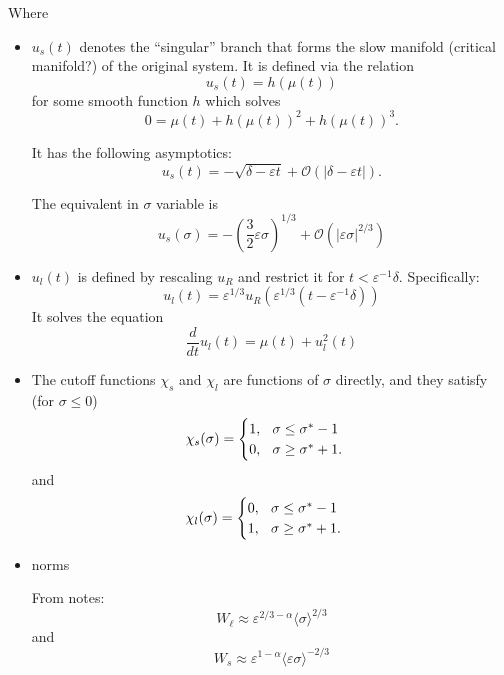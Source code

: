 \documentclass[letterpaper,11pt]{article}
\newcommand{\rmO}{\mathcal{O}}
\newcommand{\eps}{\varepsilon}
\numberwithin{equation}{section}
\theoremstyle{plain}
\begin{document}
Where 
\begin{itemize}
\item $u_s(t)$ denotes the ``singular'' branch that forms the slow manifold (critical manifold?) of the original system. It is defined via the relation
\[
u_s(t) = h(\mu(t))
\]
for some smooth function $h$ which solves
\begin{equation}\label{singular}
0 = \mu(t) + h(\mu(t))^2 + h(\mu(t))^3.
\end{equation}

It has the following asymptotics:
\begin{equation}\label{singularAsy}
u_s(t) = -\sqrt{\delta-\eps t} + \rmO(|\delta-\eps t|).
\end{equation}

The equivalent in $\sigma$ variable is
\begin{equation}\label{singularAsySig}
u_s(\sigma) = -\left(\frac{3}{2}\eps \sigma\right)^{1/3} + \rmO(|\eps \sigma|^{2/3} )
\end{equation}

\item $u_l(t)$ is defined by rescaling $u_R$ and restrict it for $t<\eps^{-1}\delta$. Specifically:
\begin{equation}\label{uldef}
u_l(t) = \eps^{1/3} u_R( \eps^{1/3}(t-\eps^{-1}\delta))
\end{equation}
It solves the equation
\begin{equation}\label{uleq}
\frac{d}{dt}u_l (t) = \mu(t) + u_l^2(t)
\end{equation}


\item The cutoff functions $\chi_s$ and $\chi_l$ are functions of $\sigma$ directly, and they satisfy (for $\sigma \le 0$)
\begin{equation}\label{cutoffIs}
\chi_s(\sigma) =\begin{cases}
1,  \hspace{0.1in} \sigma \le \sigma^* -1\\
0 , \hspace{0.1in} \sigma \ge \sigma^* +1.
\end{cases}
\end{equation}
and
\begin{equation}\label{cutoffIl}
\chi_l(\sigma) =\begin{cases}
0,  \hspace{0.1in} \sigma \le \sigma^* -1\\
1 , \hspace{0.1in} \sigma \ge \sigma^* +1.
\end{cases}
\end{equation}

\item norms

From notes:
\[
W_{\ell} \approx \eps^{2/3-\alpha}\langle \sigma \rangle^{2/3}
\]
and
\[
W_s \approx \eps^{1-\alpha}\langle \eps \sigma\rangle^{-2/3}
\]
\end{itemize} 
\end{document}
